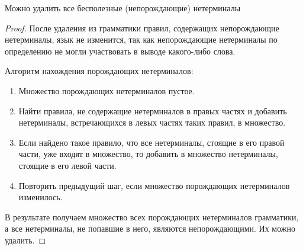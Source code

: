 \begin{lemma}
  Можно удалить все бесполезные (непорождающие) нетерминалы
\end{lemma}

\begin{proof}
  После удаления из грамматики правил, содержащих непорождающие нетерминалы, язык не изменится, так как непорождающие нетерминалы по определению не могли участвовать в выводе какого-либо слова.
  
  Алгоритм нахождения порождающих нетерминалов:
  \begin{enumerate}
  \item Множество порождающих нетерминалов пустое.
  \item Найти правила, не содержащие нетерминалов в правых частях и добавить нетерминалы, встречающихся в левых частях таких правил, в множество.
  \item Если найдено такое правило, что все нетерминалы, стоящие в его правой части, уже входят в множество, то добавить в множество нетерминалы, стоящие в его левой части.
  \item Повторить предыдущий шаг, если множество порождающих нетерминалов изменилось.
\end{enumerate}
В результате получаем множество всех порождающих нетерминалов грамматики, а все нетерминалы, не попавшие в него, являются непорождающими. Их можно удалить.
\end{proof}

